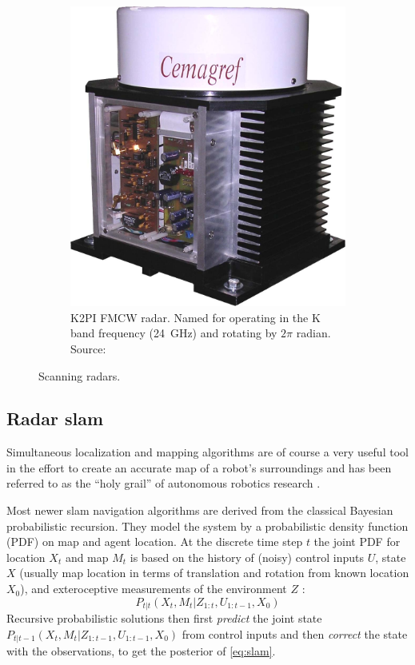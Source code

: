 \begin{figure}[htbp]
\begin{subfigure}[t]{0.3\textwidth}
        \includegraphics[max width=\linewidth]{gfx/pictures/k2pi}
        \caption{K2PI FMCW radar. Named for operating in the K band frequency (\SI{24}{GHz}) and rotating by $2\pi$ radian. Source: \cite{Rouveure2008}}
        \label{fig:k2pi}
    \end{subfigure}
    \caption{Scanning radars.}
\end{figure}


\subsection{Radar slam}\label{radar-slam}


Simultaneous localization and mapping algorithms are of course a very useful tool in the effort to create an accurate map of a robot's surroundings and has been referred to as the ``holy grail'' of autonomous robotics research \cite{Dissanayake2001}.

Most newer slam navigation algorithms are derived from the classical Bayesian probabilistic recursion. They model the system by a probabilistic density function (PDF) on map and agent location. At the discrete time step $t$ the joint PDF for location $X_t$ and map $M_t$ is based on the history of (noisy) control inputs $U$, state $X$ (usually map location in terms of translation and rotation from known location $X_0$), and exteroceptive measurements of the environment $Z$ \cite{Adams2012}:
\begin{equation} \label{eq:slam}
    P_{t|t}(X_t,M_t|Z_{1:t},U_{1:t-1},X_0)
\end{equation}
Recursive probabilistic solutions then first \textit{predict} the joint state \( P_{t|t-1}(X_t,M_t|Z_{1:t-1},U_{1:t-1},X_0) \) from control inputs and then \textit{correct} the state with the observations, to get the posterior of \cref{eq:slam}.

